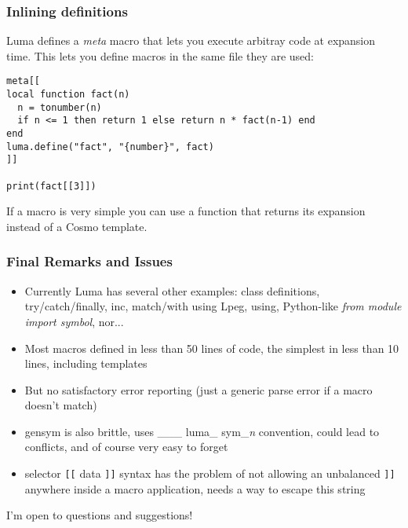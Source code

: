 \documentclass{beamer}
\begin{document}
\begin{frame}[fragile]
\frametitle{Inlining definitions}
Luma defines a \emph{meta} macro that lets you execute arbitray code
at expansion time. This lets you define macros in the same file they
are used:

\begin{verbatim}
meta[[
local function fact(n)
  n = tonumber(n)
  if n <= 1 then return 1 else return n * fact(n-1) end
end
luma.define("fact", "{number}", fact) 
]]

print(fact[[3]])
\end{verbatim}

If a macro is very simple you can use a function that returns
its expansion instead of a Cosmo template.
\end{frame}

\begin{frame}[fragile]
\frametitle{Final Remarks and Issues}
\begin{itemize}
\item Currently Luma has several other examples: class definitions,
try/catch/finally, inc, match/with using Lpeg, using, Python-like
\emph{from module import symbol}, nor...
\item Most macros defined in less than 50 lines of code, the simplest
in less than 10 lines, including templates
\item But no satisfactory error reporting (just a generic parse error if
a macro doesn't match)
\item gensym is also brittle, uses \_\_\_ luma\_ sym\_\emph{n} convention,
could lead to conflicts, and of course very easy to forget
\item selector \verb|[[| data \verb|]]| syntax has the problem of not allowing
an unbalanced \verb|]]| anywhere inside a macro application, needs a way to
escape this string
\end{itemize}
\end{frame}

\begin{frame}
\begin{center}
I'm open to questions and suggestions!
\end{center}
\end{frame}
\end{document}
